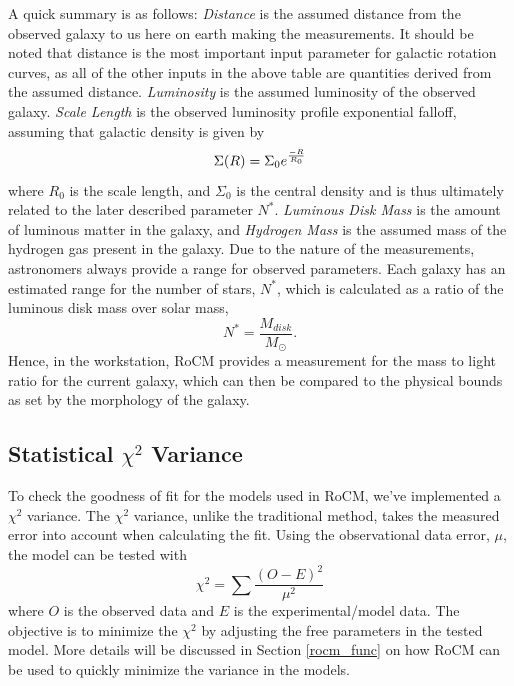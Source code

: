 \documentclass[conference]{IEEEtran-modified}
\begin{document}
A quick summary is as follows: \emph{Distance} is the assumed distance from the observed galaxy to us here on earth making the measurements.  It should be noted that distance is the most important input parameter for galactic rotation curves, as all of the other inputs in the above table are quantities derived from the assumed distance. \emph{Luminosity} is the assumed luminosity of the observed galaxy.  \emph{Scale Length} is the observed luminosity profile exponential falloff, assuming that galactic density is given by 
\begin{equation}
\Sigma(R)=\Sigma_0e^{\frac{-R}{R_0}}\\
\end{equation}
where {$R_0$} is the scale length, and {$\Sigma_0$} is the central density and is thus ultimately related to the later described parameter {$N^*$}.  \emph{Luminous Disk Mass} is the amount of luminous matter in the galaxy, and \emph{Hydrogen Mass} is the assumed mass of the hydrogen gas present in the galaxy.  Due to the nature of the measurements, astronomers always provide a range for observed parameters. Each galaxy has an estimated range for the number of stars, $N^*$, which is calculated as a ratio of the luminous disk mass over solar mass,
\begin{equation}
N^* = \frac{M_{disk}}{M_{\odot}}.
\end{equation}
Hence, in the workstation, RoCM provides a measurement for the mass to light ratio for the current galaxy, which can then be compared to the physical bounds as set by the morphology of the galaxy.


\subsection{Statistical $\chi^2$ Variance}
To check the goodness of fit for the models used in RoCM, we've implemented a $\chi^2$ variance. The $\chi^2$ variance, unlike the traditional method, takes the measured error into account when calculating the fit. Using the observational data error, $\mu$, the model can be tested with
\begin{equation}
\chi^2 = \sum \frac{(O-E)^2}{\mu^2}
\end{equation} 
where $O$ is the observed data and $E$ is the experimental/model data. The objective is to minimize the $\chi^2$ by adjusting the free parameters in the tested model.  More details will be discussed in Section \ref{rocm_func} on how RoCM can be used to quickly minimize the variance in the models.
\end{document}
